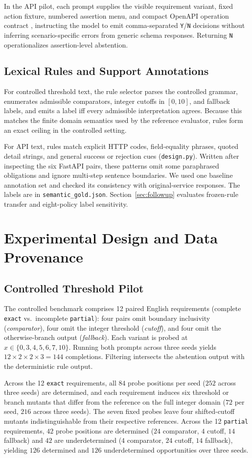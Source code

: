 \documentclass[sigconf,nonacm]{acmart}
\begin{document}
In the API pilot, each prompt supplies the visible requirement variant, fixed action fixture, numbered assertion menu, and compact OpenAPI operation contract \cite{openapi}, instructing the model to emit comma-separated \texttt{Y}/\texttt{N} decisions without inferring scenario-specific errors from generic schema responses. Returning \texttt{N} operationalizes assertion-level abstention.

\subsection{Lexical Rules and Support Annotations}
For controlled threshold text, the rule selector parses the controlled grammar, enumerates admissible comparators, integer cutoffs in $[0,10]$, and fallback labels, and emits a label iff every admissible interpretation agrees. Because this matches the finite domain semantics used by the reference evaluator, rules form an exact ceiling in the controlled setting.

For API text, rules match explicit HTTP codes, field-equality phrases, quoted detail strings, and general success or rejection cues (\texttt{design.py}). Written after inspecting the six FastAPI pairs, these patterns omit some paraphrased obligations and ignore multi-step sentence boundaries. We used one baseline annotation set and checked its consistency with original-service responses. The labels are in \nolinkurl{semantic_gold.json}. Section~\ref{sec:followup} evaluates frozen-rule transfer and eight-policy label sensitivity.

\section{Experimental Design and Data Provenance}
\subsection{Controlled Threshold Pilot}
The controlled benchmark comprises 12 paired English requirements (complete \texttt{exact} vs.\ incomplete \texttt{partial}): four pairs omit boundary inclusivity (\emph{comparator}), four omit the integer threshold (\emph{cutoff}), and four omit the otherwise-branch output (\emph{fallback}). Each variant is probed at $x\in\{0,3,4,5,6,7,10\}$. Running both prompts across three seeds yields $12\times2\times2\times3=144$ completions. Filtering intersects the abstention output with the deterministic rule output.

Across the 12 \texttt{exact} requirements, all $84$ probe positions per seed ($252$ across three seeds) are determined, and each requirement induces six threshold or branch mutants that differ from the reference on the full integer domain ($72$ per seed, $216$ across three seeds). The seven fixed probes leave four shifted-cutoff mutants indistinguishable from their respective references. Across the 12 \texttt{partial} requirements, $42$ probe positions are determined ($24$ comparator, $4$ cutoff, $14$ fallback) and $42$ are underdetermined ($4$ comparator, $24$ cutoff, $14$ fallback), yielding $126$ determined and $126$ underdetermined opportunities over three seeds.
\end{document}
